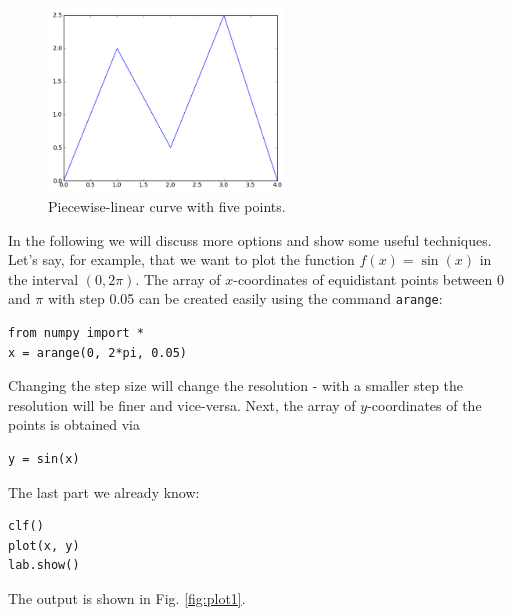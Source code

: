\documentclass[article,A4,12pt]{llncs}
\begin{document}
\begin{figure}[!ht]
\begin{center}
\hbox{}
\hspace{-6mm}
\includegraphics[width=0.56\textwidth]{img/plot.png}
\end{center}
\vspace{-2mm}
\caption{Piecewise-linear curve with five points.}
\label{fig:plot}
\end{figure}
\noindent
In the following we will discuss more options and show some useful techniques.
Let's say, for example, that we want to plot the function $f(x) = \sin(x)$
in the interval $(0, 2\pi)$. The array of $x$-coordinates of equidistant points 
between 0 and $\pi$ with step 0.05 can be created easily using the command {\tt arange}:

\begin{verbatim}
from numpy import *
x = arange(0, 2*pi, 0.05)
\end{verbatim}
Changing the step size will change the resolution - with a smaller step the resolution will 
be finer and vice-versa. Next, the array of $y$-coordinates of the points is obtained via

\begin{verbatim}
y = sin(x)
\end{verbatim}
The last part we already know:

\begin{verbatim}
clf()
plot(x, y)
lab.show()
\end{verbatim}
\noindent
The output is shown in Fig. \ref{fig:plot1}.

\newpage
\end{document}
